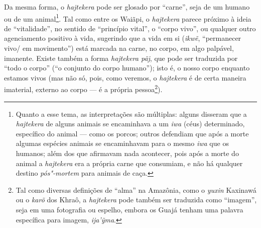 Da mesma forma, o \emph{hajtekera} pode ser glosado por ``carne'', seja de
um humano ou de um animal\footnote{Quanto a esse tema, as interpretações
  são múltiplas: alguns disseram que a \emph{hajtekera} de alguns
  animais se encaminhava a um \emph{iwa} (céus) determinado, específico
  do animal --- como os porcos; outros defendiam que após a morte algumas
  espécies animais se encaminhavam para o mesmo \emph{iwa} que os
  humanos; além dos que afirmavam nada acontecer, pois após a morte do
  animal a \emph{hajtekera} era a própria carne que consumiam, e não há
  qualquer destino \emph{pós"-mortem} para animais de caça.}. Tal como
entre os Waiãpi, o \emph{hajtekera} parece próximo à ideia de
``vitalidade'', no sentido de ``princípio vital'', o ``corpo vivo'', ou
qualquer outro agenciamento positivo à vida, sugerindo que a vida em si
(\emph{ikwẽ}, ``permanecer vivo/ em movimento'') está marcada na carne, no
corpo, em algo palpável, imanente. Existe também a forma \emph{hajtekera
pãj}, que pode ser traduzida por ``todo o corpo'' (``o conjunto do corpo
humano''); isto é, o nosso corpo enquanto estamos vivos (mas não só,
pois, como veremos, o \emph{hajtekera} é de certa maneira imaterial,
externo ao corpo --- é a própria pessoa\footnote{Tal como diversas
  definições de ``alma'' na Amazônia, como o \emph{yuxin} Kaxinawá ou o
  \emph{karõ} dos Khraô, a \emph{hajtekera} pode também ser traduzida
  como ``imagem'', seja em uma fotografia ou espelho, embora os Guajá
  tenham uma palavra específica para imagem, \emph{ija'ỹma}.}).

